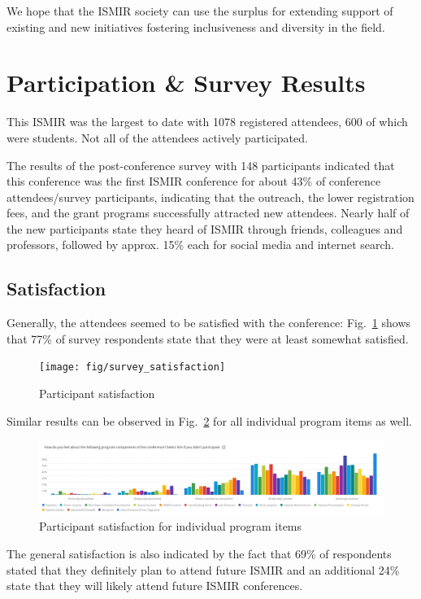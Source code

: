 \documentclass[%
10pt,								%
titlepage,						%
]
{scrartcl}
\begin{document}
                We hope that the ISMIR society can use the surplus for extending support of existing and new initiatives fostering inclusiveness and diversity in the field.
    
\section{Participation \& Survey Results}
    This ISMIR was the largest to date with 1078 registered attendees, 600 of which were students. Not all of the attendees actively participated.
    
The results of the post-conference survey with 148 participants indicated that this conference was the first ISMIR conference for about 43\% of conference attendees/survey participants, indicating that the outreach, the lower registration fees, and the grant programs successfully attracted new attendees. Nearly half of the new participants state they heard of ISMIR through friends, colleagues and professors, followed by approx. 15\% each for social media and internet search.

    \subsection{Satisfaction}
        Generally, the attendees seemed to be satisfied with the conference: Fig.~\ref{fig:survey_satisfaction} shows that 77\% of survey respondents state that they were at least somewhat satisfied.
        \begin{figure}%
            \centering
            \texttt{[image: fig/survey\_satisfaction]}%
            \caption{Participant satisfaction}%
            \label{fig:survey_satisfaction}%
        \end{figure}
        
        Similar results can be observed in Fig.~\ref{fig:survey_satisfaction_item} for all individual program items as well.
        \begin{figure}%
            \includegraphics[width=\columnwidth]{fig/survey_satisfaction_item}%
            \caption{Participant satisfaction for individual program items}%
            \label{fig:survey_satisfaction_item}%
        \end{figure}
        The general satisfaction is also indicated by the fact that 69\% of respondents stated that they definitely plan to attend future ISMIR and an additional 24\% state that they will likely attend future ISMIR conferences.
        
\end{document}
